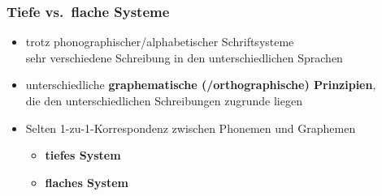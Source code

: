 \begin{frame}
\frametitle{Tiefe vs.\ flache Systeme}

\begin{itemize}
	\item trotz phonographischer/alphabetischer Schriftsysteme \ras\\
              sehr verschiedene Schreibung in den unterschiedlichen Sprachen

	\item unterschiedliche \textbf{graphematische (/orthographische) Prinzipien},\\
          die den unterschiedlichen Schreibungen zugrunde liegen

	\item Selten 1-zu-1-Korrespondenz zwischen Phonemen und Graphemen
	
	\begin{itemize}
		\item \textbf{tiefes System}\\ 
		\vs
		\item \textbf{flaches System}
	\end{itemize}
\end{itemize}
\end{frame}


